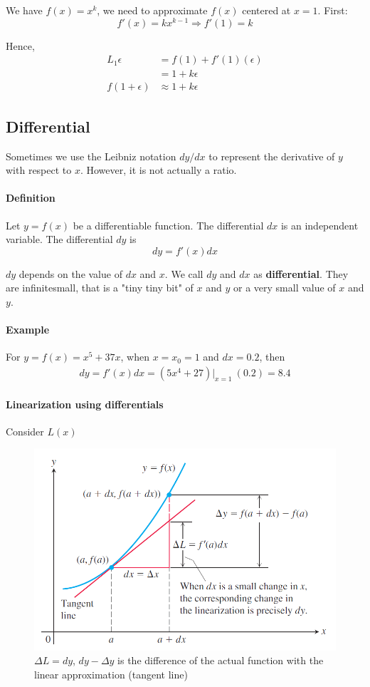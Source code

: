 \documentclass[12pt]{article}
\begin{document}
We have $f(x) = x^k$, we need to approximate $f(x)$ centered at $x = 1$. First:
\[
    f'(x) = kx^{k - 1} \Rightarrow f'(1) = k
\]

Hence,
\begin{align*} 
    L_1{\epsilon} &= f(1) + f'(1)(\epsilon) \\
    &= 1 + k\epsilon \\
    f(1 + \epsilon) &\approx 1 + k\epsilon
\end{align*}
\subsection{Differential}
Sometimes we use the Leibniz notation $dy/dx$ to represent the derivative of $y$ with respect
to $x$. However, it is not actually a ratio.

\paragraph{Definition}
Let $y = f(x)$ be a differentiable function. The differential $dx$ is an
independent variable. The differential $dy$ is 
\[
    dy = f'(x) dx
\]

$dy$ depends on the value of $dx$ and $x$. We call $dy$ and $dx$ as \textbf{differential}. They are infinitesmall, that is 
a "tiny tiny bit" of $x$ and $y$ or a very small value of $x$ and $y$.

\paragraph{Example} 
For $y = f(x) = x^5 +37x$, when $x = x_0 = 1$ and $dx = 0.2$, then 
\begin{align*} 
    dy = f'(x) dx = (5x^4 + 27) |_{x = 1}\:  (0.2) = 8.4
\end{align*}

\paragraph{Linearization using differentials} Consider $L(x)$
\begin{figure} 
    \centering
    \includegraphics[width = 0.5\linewidth]{Images/differentials.png}
    \caption{$\Delta L = dy$, $dy - \Delta y$ is the difference of the actual function with the linear approximation (tangent line)}
\end{figure}
\end{document}
